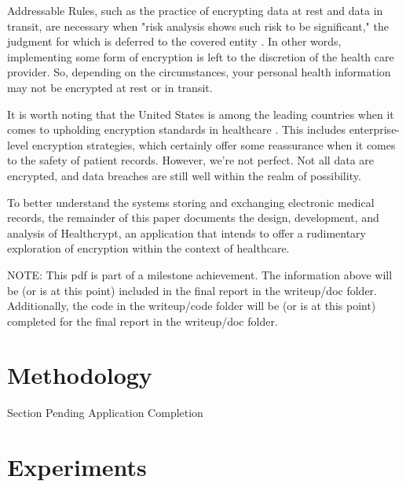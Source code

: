 \documentclass[letterpaper, 10pt,DIV=13]{scrartcl}
\begin{document}
\begin{multicols}{2}
\begin{spacing}{1.25}
Addressable Rules, such as the practice of encrypting data at rest and data in transit, are necessary when "risk analysis shows such risk to be significant," the judgment for which is deferred to the covered entity \cite{hippaprof2017}. In other words, implementing some form of encryption is left to the discretion of the health care provider. So, depending on the circumstances, your personal health information may not be encrypted at rest or in transit.

It is worth noting that the United States is among the leading countries when it comes to upholding encryption standards in healthcare \cite{ponemon2020}. This includes enterprise-level encryption strategies, which certainly offer some reassurance when it comes to the safety of patient records. However, we're not perfect. Not all data are encrypted, and data breaches are still well within the realm of possibility.

To better understand the systems storing and exchanging electronic medical records, the remainder of this paper documents the design, development, and analysis of Healthcrypt, an application that intends to offer a rudimentary exploration of encryption within the context of healthcare.

NOTE: This pdf is part of a milestone achievement. The information above will be (or is at this point) included in the final report in the writeup/doc folder. Additionally, the code in the writeup/code folder will be (or is at this point) completed for the final report in the writeup/doc folder.

\end{spacing}

\vspace{-2.5pt}

\section*{Methodology}
\begin{spacing}{1.25}

Section Pending Application Completion

\end{spacing}

\vspace{-2.5pt}

\section*{Experiments}
\begin{spacing}{1.25}


\end{spacing}
\end{multicols}
\end{document}
